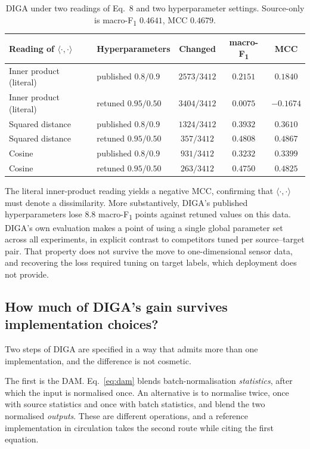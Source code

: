 \documentclass[a4paper,fleqn]{cas-dc}
\newcommand{\macf}{macro-F\textsubscript{1}}
\begin{document}
\begin{table}[t]
\centering
\caption{DIGA under two readings of Eq.~8 and two hyperparameter settings. Source-only is
\macf{} $0.4641$, MCC $0.4679$.}
\label{tab:diga}
\small
\begin{tabular}{llccc}
\toprule
Reading of $\langle\cdot,\cdot\rangle$ & Hyperparameters & Changed & \macf & MCC \\
\midrule
Inner product (literal) & published $0.8/0.9$   & $2573/3412$ & $0.2151$ & $0.1840$ \\
Inner product (literal) & retuned $0.95/0.50$   & $3404/3412$ & $0.0075$ & $-0.1674$ \\
Squared distance        & published $0.8/0.9$   & $1324/3412$ & $0.3932$ & $0.3610$ \\
Squared distance        & retuned $0.95/0.50$   & $357/3412$  & $\mathbf{0.4808}$ & $\mathbf{0.4867}$ \\
Cosine                  & published $0.8/0.9$   & $931/3412$  & $0.3232$ & $0.3399$ \\
Cosine                  & retuned $0.95/0.50$   & $263/3412$  & $0.4750$ & $0.4825$ \\
\bottomrule
\end{tabular}
\end{table}

The literal inner-product reading yields a negative MCC, confirming that
$\langle\cdot,\cdot\rangle$ must denote a dissimilarity. More substantively, DIGA's
published hyperparameters lose $8.8$ \macf{} points against retuned values on this data.
DIGA's own evaluation makes a point of using a single global parameter set across all
experiments, in explicit contrast to competitors tuned per source--target pair. That
property does not survive the move to one-dimensional sensor data, and recovering the loss
required tuning on target labels, which deployment does not provide.

\subsection{How much of DIGA's gain survives implementation choices?}
\label{sec:res-digaimpl}

Two steps of DIGA are specified in a way that admits more than one implementation, and the
difference is not cosmetic.

The first is the DAM. Eq.~\ref{eq:dam} blends batch-normalisation \emph{statistics}, after
which the input is normalised once. An alternative is to normalise twice, once with source
statistics and once with batch statistics, and blend the two normalised \emph{outputs}. These
are different operations, and a reference implementation in circulation takes the second
route while citing the first equation.
\end{document}
